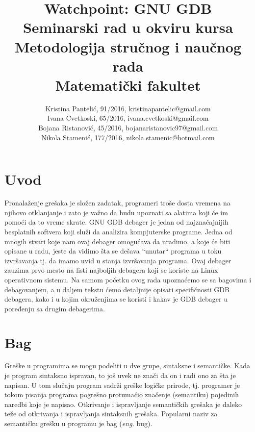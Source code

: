 \documentclass[a4paper]{article}
\begin{document}
\title{Watchpoint: GNU GDB\\ \small{Seminarski rad u okviru kursa\\Metodologija stručnog i naučnog rada\\ Matematički fakultet}}

\author{Kristina Pantelić, 91/2016, kristinapantelic@gmail.com 
\\
Ivana Cvetkoski, 65/2016, ivana.cvetkoski@gmail.com
\\
Bojana Ristanović, 45/2016, bojanaristanovic97@gmail.com
\\
Nikola Stamenić, 177/2016, nikola.stamenic@hotmail.com
}

\maketitle


\tableofcontents

\newpage

\section{Uvod}
\label{sec:uvod}

Pronalaženje grešaka je složen zadatak, programeri troše dosta vremena na njihovo otklanjanje i zato je važno da budu upoznati sa alatima 
koji će im pomoći da to vreme skrate. GNU GDB debager je jedan od najznačajnijih besplatnih softvera koji služi da analizira kompjuterske programe. Jedna od mnogih stvari koje nam ovaj debager omogućava da uradimo, a koje će biti opisane u radu, jeste da vidimo šta se dešava ``unutar`` programa u toku izvršavanja tj. da imamo uvid u stanja izvršavanja programa. Ovaj debager zauzima prvo mesto na listi 
najboljih debagera koji se koriste na Linux operativnom sistemu\cite{ubuntupit}. Na samom početku ovog rada upoznaćemo se sa bagovima i 
debagovanjem, a u daljem tekstu ćemo detaljnije opisati specifičnosti GDB debagera, kako i u kojim okruženjima se koristi i kakav je GDB 
debager u poređenju sa drugim debagerima.   

\section{Bag}
\label{sec:bag}
Greške u programima se mogu podeliti u dve grupe, sintaksne i semantičke. Kada je program sintaksno ispravan, to još uvek
 ne znači da on i radi ono za šta je napisan. U tom slučaju program sadrži greške logičke prirode, tj. programer je tokom 
 pisanja programa  pogrešno protumačio značenje (semantiku) pojedinih naredbi koje je napisao. Otkrivanje i ispravljanje 
 semantičkih grešaka je daleko teže od otkrivanja i ispravljanja sintaksnih grešaka. Popularni naziv za semantičku grešku 
 u programu je bag (\textit{eng.} bug).
\end{document}
